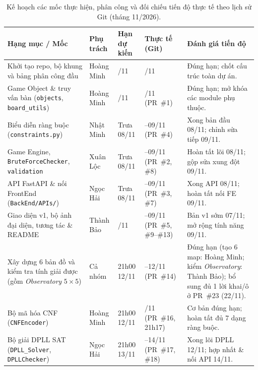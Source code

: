 \begin{sloppypar}
\begin{table}[!t]
    \centering\footnotesize
    \caption{Kế hoạch các mốc thực hiện, phân công và đối chiếu tiến độ thực tế theo lịch sử Git (tháng 11/2026).}
    \label{tab:project_plan}
    \setlength{\tabcolsep}{4pt}
    \renewcommand{\arraystretch}{1.2}
    \begin{tabularx}{\textwidth}{>{\raggedright\arraybackslash}p{4.0cm}>{\raggedright\arraybackslash}p{2.05cm}>{\raggedright\arraybackslash}p{1.75cm}>{\raggedright\arraybackslash}p{2.3cm}>{\raggedright\arraybackslash}X}
        \toprule
        \textbf{Hạng mục / Mốc} & \textbf{Phụ trách} & \textbf{Hạn dự kiến} & \textbf{Thực tế (Git)} & \textbf{Đánh giá tiến độ} \\
        \midrule
        Khởi tạo repo, bộ khung và bảng phân công đầu & Hoàng Minh & 05/11 & 05/11 & Đúng hạn; chốt cấu trúc toàn dự án. \\
        Game Object \& truy vấn bàn (\texttt{objects}, \texttt{board\_utils}) & Hoàng Minh & 07/11 & 07/11 (PR~\#1) & Đúng hạn; mở khóa các module phụ thuộc. \\
        Biểu diễn ràng buộc (\texttt{constraints.py}) & Nhật Minh & Trưa 08/11 & 08--09/11 (PR~\#4) & Xong bản đầu 08/11; chỉnh sửa tiếp 09/11. \\
        Game Engine, \texttt{BruteForceChecker}, \texttt{validation} & Xuân Lộc & Trưa 08/11 & 08--09/11 (PR~\#2, \#8) & Hoàn tất lõi 08/11; gộp sửa xung đột 09/11. \\
        API FastAPI \& nối FrontEnd (\nolinkurl{BackEnd/APIs/}) & Ngọc Hải & Trưa 08/11 & 08--09/11 (PR~\#3, \#7) & Xong API 08/11; hoàn tất nối FE 09/11. \\
        Giao diện v1, bộ ảnh đại diện, tương tác \& README & Thành Bảo & 08/11 & 07--09/11 (PR~\#5, \#9--\#13) & Bản v1 sớm 07/11; mở rộng tính năng 09/11. \\
        Xây dựng 6 bản đồ và kiểm tra tính giải được (gồm \textit{Observatory} $5\times5$) & Cả nhóm & 21h00 12/11 & 10--12/11 (PR~\#14) & Đúng hạn (tạo 6 map: Hoàng Minh; kiểm \textit{Observatory}: Thành Bảo); bổ sung đủ 1 lời khai/ô ở PR~\#23 (22/11). \\
        Bộ mã hóa CNF (\texttt{CNFEncoder}) & Hoàng Minh & 21h00 12/11 & 12/11 (PR~\#16, 21h17) & Cơ bản đúng hạn; hoàn tất đủ 7 dạng ràng buộc. \\
        Bộ giải DPLL SAT (\texttt{DPLL\_Solver}, \texttt{DPLLChecker}) & Ngọc Hải & 21h00 13/11 & 12--14/11 (PR~\#17, \#18) & Xong lõi DPLL 12/11; hợp nhất \& nối API 14/11. \\

\end{tabularx}
\end{table}
\end{sloppypar}
